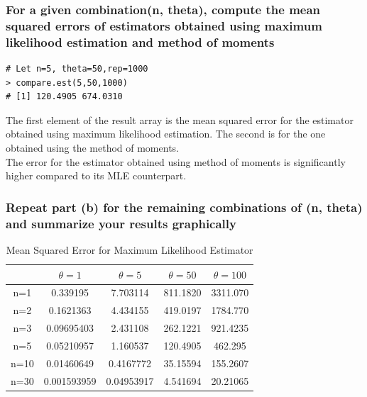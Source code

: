 \documentclass[12pt,letterpaper,titlepage,en-US]{article}
\begin{document}
\subsubsection{For a given combination(n, theta), compute the mean squared errors of estimators obtained using maximum likelihood estimation and method of moments}
\begin{knitrout}
\color{fgcolor}
\begin{kframe}
\begin{verbatim}
# Let n=5, theta=50,rep=1000
> compare.est(5,50,1000)
# [1] 120.4905 674.0310
\end{verbatim}
\end{kframe}
\end{knitrout}


The first element of the result array is the mean squared error for the estimator obtained using maximum likelihood estimation. The second is for the one obtained using the method of moments.\\

The error for the estimator obtained using method of moments is significantly higher compared to its MLE counterpart.


\subsubsection{Repeat part (b) for the remaining combinations of (n, theta) and summarize your results graphically}
\begin{table}[H]
\centering
\begin{tabular}{|c|c|c|c|c|}
\hline
& $\theta=1 $  &$\theta=5 $   &$\theta=50$    &$\theta=100$ \\\hline
n=1	&0.339195 	 &7.703114 	&811.1820	 &3311.070\\\hline
n=2	&	0.1621363 	&4.434155 	&419.0197 	&1784.770\\\hline
n=3	&0.09695403 	&2.431108	 &262.1221 	&921.4235\\\hline
n=5	&0.05210957 	&1.160537	 &120.4905 	&462.295\\\hline
n=10	&0.01460649 	&0.4167772	 &35.15594	& 155.2607\\\hline
n=30	&0.001593959 	&0.04953917	 &4.541694 	&20.21065\\\hline
\end{tabular}
\caption{Mean Squared Error for Maximum Likelihood Estimator}\label{1}
\end{table}
\end{document}
